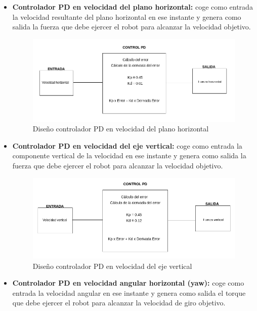 \begin{itemize}
    \item \textbf{Controlador PD en velocidad del plano horizontal:} coge como entrada la velocidad resultante del plano horizontal en ese instante y genera como salida la fuerza que debe ejercer el robot para alcanzar la velocidad objetivo. 
    
    \begin{figure}[h!]
    \centering
    \includegraphics[width=\textwidth, height=0.4\textwidth]{controlador_PD_XZ.png}
    \caption{Diseño controlador PD en velocidad del plano horizontal\footnotemark}
    \label{fig:esquema_pd_1}
    \end{figure}
    
    \item \textbf{Controlador PD en velocidad del eje vertical:} coge como entrada la componente vertical de la velocidad en ese instante y genera como salida la fuerza que debe ejercer el robot para alcanzar la velocidad objetivo. 
    
    \begin{figure}[h!]
    \centering
    \includegraphics[width=\textwidth, height=0.4\textwidth]{controlador_PD_vel_Y.png}
    \caption{Diseño controlador PD en velocidad del eje vertical\footnotemark}
    \label{fig:esquema_pd_2}
    \end{figure}
    
    \item \textbf{Controlador PD en velocidad angular horizontal (yaw):} coge como entrada la velocidad angular en ese instante y genera como salida el torque que debe ejercer el robot para alcanzar la velocidad de giro objetivo. 
    

\end{itemize}
